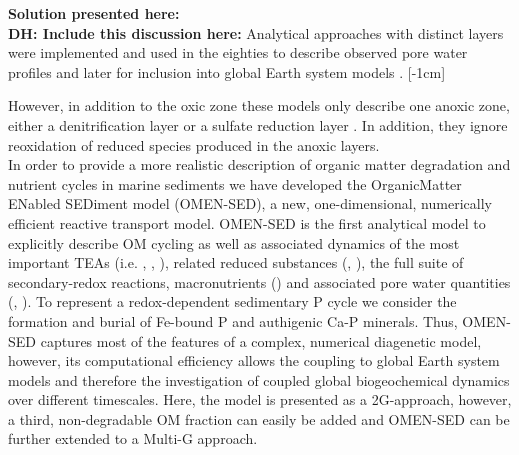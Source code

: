 \documentclass[gmd, manuscript]{copernicus}
\begin{document}
\textbf{Solution presented here:}\\
\textbf{DH: Include this discussion here:}
Analytical approaches with distinct layers were implemented and used in the eighties to describe observed pore water profiles 
\citep[e.g.][]{billen1982idealized, goloway_diagenetic_1982} and later for inclusion into global Earth system models \citep{tromp_global_1995}. 
[-1cm]%

However, in addition to the oxic zone these models only describe one anoxic zone, either a denitrification layer \citep{billen1982idealized, goloway_diagenetic_1982} or a sulfate reduction layer \citep{tromp_global_1995}. 
In addition, they ignore reoxidation of reduced species produced in the anoxic layers.\\ 

In order to provide a more realistic description of organic matter degradation and nutrient cycles in marine sediments we have developed the OrganicMatter ENabled SEDiment model (OMEN-SED), 
a new, one-dimensional, numerically efficient reactive transport model. OMEN-SED is the first analytical model to explicitly describe OM cycling as well as associated dynamics of the most important TEAs 
(i.e. , , ), related reduced substances (, ), the full suite of secondary-redox reactions, macronutrients () and associated pore water quantities (, ). 
To represent a redox-dependent sedimentary P cycle we consider the formation and burial of Fe-bound P and authigenic Ca-P minerals. %
Thus, OMEN-SED captures most of the features of a complex, numerical diagenetic model, however, its computational efficiency allows the coupling to global Earth system models and therefore the investigation of coupled global biogeochemical 
dynamics over different timescales. 
Here, the model is presented as a 2G-approach, however, a third, non-degradable OM fraction can easily be added and OMEN-SED can be further extended to a Multi-G approach. 
\end{document}
